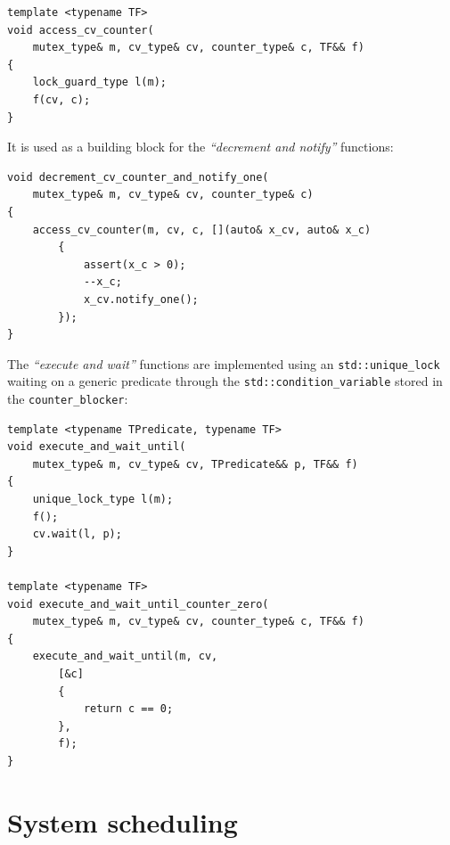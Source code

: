 \documentclass[twoside, 12pt, a4paper, openany]{book}
\begin{document}
\begin{verbatim}
template <typename TF>
void access_cv_counter(
    mutex_type& m, cv_type& cv, counter_type& c, TF&& f)
{
    lock_guard_type l(m);
    f(cv, c);
}
\end{verbatim}

It is used as a building block for the \emph{``decrement and notify''}
functions:

\begin{verbatim}
void decrement_cv_counter_and_notify_one(
    mutex_type& m, cv_type& cv, counter_type& c)
{
    access_cv_counter(m, cv, c, [](auto& x_cv, auto& x_c)
        {
            assert(x_c > 0);
            --x_c;
            x_cv.notify_one();
        });
}
\end{verbatim}

The \emph{``execute and wait''} functions are implemented using an
\texttt{std::unique_lock}
waiting on a generic predicate through the
\texttt{std::condition_variable}
stored in the
\texttt{counter_blocker}:

\begin{verbatim}
template <typename TPredicate, typename TF>
void execute_and_wait_until(
    mutex_type& m, cv_type& cv, TPredicate&& p, TF&& f)
{
    unique_lock_type l(m);
    f();
    cv.wait(l, p);
}

template <typename TF>
void execute_and_wait_until_counter_zero(
    mutex_type& m, cv_type& cv, counter_type& c, TF&& f)
{
    execute_and_wait_until(m, cv,
        [&c]
        {
            return c == 0;
        },
        f);
}
\end{verbatim}

\section{System scheduling}\label{system-scheduling}
\end{document}
